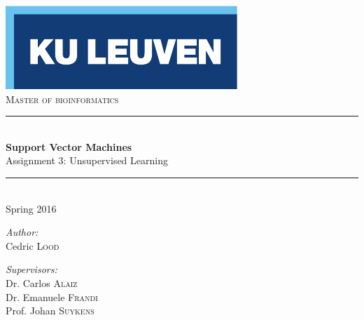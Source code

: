 \begin{titlepage}
  \begin{center}
    
    \includegraphics[scale=1.5]{figures/kuleuven_logo.pdf}~\\[4.5cm]
    \textsc{\Large Master of bioinformatics}\\[0.5cm]

    \rule{\linewidth}{0.3mm}\\[0.4cm]
    {\huge \bfseries Support Vector Machines} \\[0.4cm]
    {\large Assignment 3: Unsupervised Learning} \\[0.4cm]
    \rule{\linewidth}{0.3mm}\\[0.4cm]
    {\large Spring 2016} \\[1.0cm]
    
    \begin{minipage}{0.4\textwidth}
      \begin{flushleft} \large
        \emph{Author:}\\
	Cedric \textsc{Lood}
      \end{flushleft}
    \end{minipage}
    \begin{minipage}{0.4\textwidth}
      \begin{flushright} \large
        \emph{Supervisors:} \\
        Dr. Carlos \textsc{Alaiz}\\
        Dr. Emanuele \textsc{Frandi}\\
        Prof. Johan \textsc{Suykens}\\
        \hfill \newline 
      \end{flushright}
    \end{minipage}
    
    \vfill


\end{center}
\end{titlepage}
